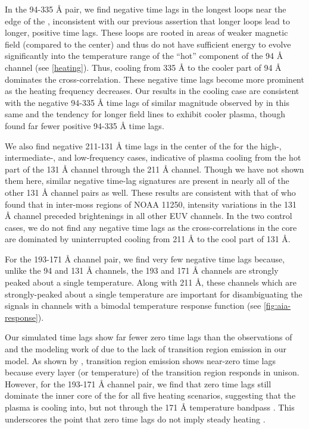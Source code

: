 In the 94-335 \AA{} pair, we find negative time lags in the longest loops near the edge of the \AR{}, inconsistent with our previous assertion that longer loops lead to longer, positive time lags. These loops are rooted in areas of weaker magnetic field (compared to the center) and thus do not have sufficient energy to evolve significantly into the temperature range of the ``hot'' component of the 94 \AA{} channel (see \autoref{heating}). Thus, cooling from 335 \AA{} to the cooler part of 94 \AA{} dominates the cross-correlation. These negative time lags become more prominent as the heating frequency decreases. Our results in the cooling case are consistent with the negative 94-335 \AA{} time lags of similar magnitude observed by \citet{viall_survey_2017} in this same \AR{} and the tendency for longer field lines to exhibit cooler plasma, though \citeauthor{viall_survey_2017} found far fewer positive 94-335 \AA{} time lags.

We also find negative 211-131 \AA{} time lags in the center of the \AR{} for the high-, intermediate-, and low-frequency cases, indicative of plasma cooling from the hot part of the 131 \AA{} channel through the 211 \AA{} channel. Though we have not shown them here, similar negative time-lag signatures are present in nearly all of the other 131 \AA{} channel pairs as well. These results are consistent with that of \citet{cadavid_heating_2014} who found that in inter-moss regions of \AR{} NOAA 11250, intensity variations in the 131 \AA{} channel preceded brightenings in all other EUV channels. In the two control cases, we do not find any negative time lags as the cross-correlations in the core are dominated by uninterrupted cooling from 211 \AA{} to the cool part of 131 \AA{}.

For the 193-171 \AA{} channel pair, we find very few negative time lags because, unlike the 94 and 131 \AA{} channels, the 193 and 171 \AA{} channels are strongly peaked about a single temperature. Along with 211 \AA{}, these channels which are strongly-peaked about a single temperature are important for disambiguating the signals in channels with a bimodal temperature response function (see \autoref{fig:aia-response}).

Our simulated time lags show far fewer zero time lags than the observations of \citet{viall_evidence_2012,viall_survey_2017} and the modeling work of \citet{bradshaw_patterns_2016} due to the lack of transition region emission in our model. As shown by \citet{viall_transition_2015}, transition region emission shows near-zero time lags because every layer (or temperature) of the transition region responds in unison. However, for the 193-171 \AA{} channel pair, we find that zero time lags still dominate the inner core of the \AR{} for all five heating scenarios, suggesting that the plasma is cooling into, but not through the 171 \AA{} temperature bandpass \citep{viall_survey_2017}. This underscores the point that zero time lags do not imply steady heating \citep{viall_transition_2015,viall_signatures_2016}.

